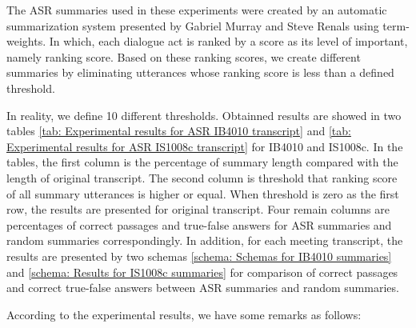 \documentclass[10pt,a4paper]{article}
\numberwithin{algorithm}{section}  %
\begin{document}
The ASR summaries used in these experiments were created by an automatic summarization system presented by Gabriel Murray and Steve Renals \cite{ASR_summaries} using term-weights. In which, each dialogue act is ranked by a score as its level of important, namely ranking score. Based on these ranking scores, we create different summaries by eliminating utterances whose ranking score is less than a defined threshold.

In reality, we define 10 different thresholds. Obtainned results are showed in two tables \ref{tab: Experimental results for ASR IB4010 transcript} and \ref{tab: Experimental results for ASR IS1008c transcript} for IB4010 and IS1008c. In the tables, the first column is the percentage of summary length compared with the length of original transcript. The second column is threshold that ranking score of all summary utterances is higher or equal. When threshold is zero as the first row, the results are presented for original transcript. Four remain columns are percentages of correct passages and true-false answers for ASR summaries and random summaries correspondingly. In addition, for each meeting transcript, the results are presented by two schemas \ref{schema: Schemas for IB4010 summaries} and \ref{schema: Results for IS1008c summaries} for comparison of correct passages and correct true-false answers between ASR summaries and random summaries.

According to the experimental results, we have some remarks as follows:
\end{document}
